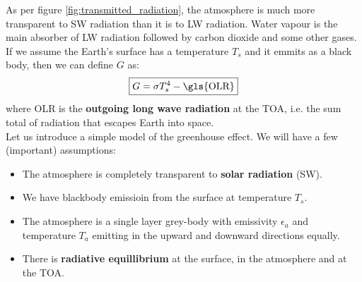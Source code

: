 As per figure \ref{fig:transmitted_radiation}, the atmosphere is much more transparent to \gls{SW} radiation than
it is to \gls{LW} radiation. Water vapour is the main absorber of \gls{LW} radiation followed by
carbon dioxide and some other gases. If we assume the Earth's surface has a temperature $T_s$ and it emmits as a black
body, then we can define $G$ as:
$$
\boxed{
    G = \sigma T_s^4 - \text{\gls{OLR}}
}
$$
where \gls{OLR} is the \textbf{outgoing long wave radiation} at the \gls{TOA}, i.e. the sum total
of radiation that escapes Earth into space.\\

\noindent Let us introduce a simple model of the greenhouse effect. We will have a few (important) assumptions:
\begin{itemize}
    \item The atmosphere is completely transparent to \textbf{solar radiation} (\gls{SW}).
    \item We have blackbody emissioin from the surface at temperature $T_s$.
    \item The atmosphere is a single layer grey-body with \gls{emissivity} $\epsilon_a$ and
    temperature $T_a$ emitting in the upward and downward directions equally.
    \item There is \textbf{radiative equillibrium} at the surface, in the atmosphere and at the \gls{TOA}.
\end{itemize}


